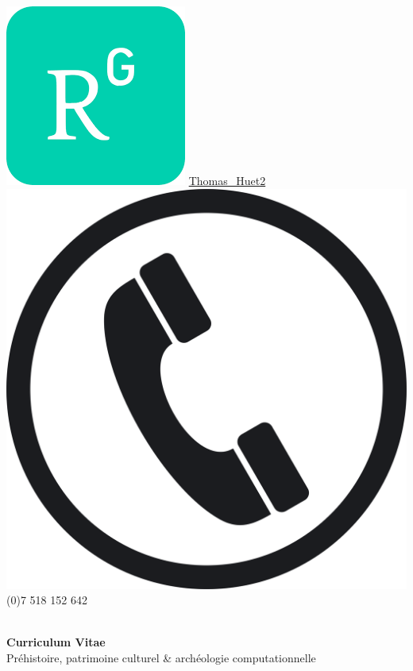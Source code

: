 \documentclass{article}
\begin{document}
\includegraphics[scale=0.05]{rgate} \quad \href{https://www.researchgate.net/profile/Thomas\_Huet2}{Thomas\_Huet2} \\
\includegraphics[scale=0.005]{phone} \quad  {} (0)7 518 152 642 \\

\\

\begin{adjustwidth}{50pt}{50pt}
\begin{center}
\large{\textbf{Curriculum Vitae}}\\
\large{Préhistoire, patrimoine culturel \& archéologie computationnelle} 
\end{center}
\end{adjustwidth}
\end{document}
